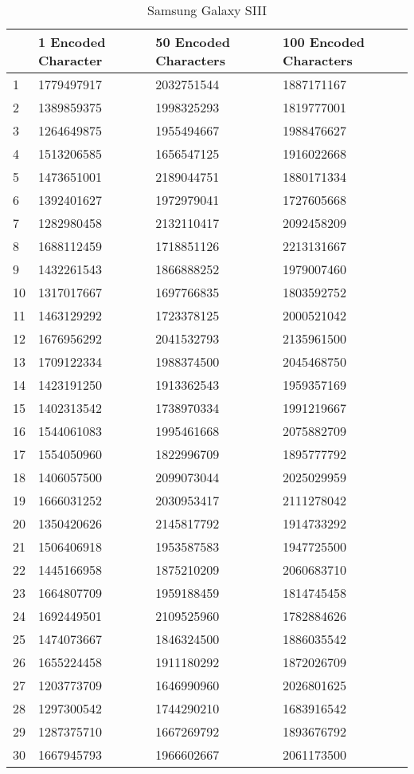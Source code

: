 	\begin{table}[ht!]
    		\caption{Samsung Galaxy SIII} \label{tab:distamceGoogleGlassFull}
		\centering \begin{tabularx}{\textwidth}{l|X|X|X} \hline
		& \textbf{1 Encoded Character} & \textbf{50 Encoded Characters} & \textbf{100 Encoded Characters} \\ \hline \hline
		
		1&	1779497917	&	2032751544	&	1887171167	\\ \hline
		2&	1389859375	&	1998325293	&	1819777001	\\ \hline
		3&	1264649875	&	1955494667	&	1988476627	\\ \hline
		4&	1513206585	&	1656547125	&	1916022668	\\ \hline
		5&	1473651001	&	2189044751	&	1880171334	\\ \hline
		6&	1392401627	&	1972979041	&	1727605668	\\ \hline
		7&	1282980458	&	2132110417	&	2092458209	\\ \hline
		8&	1688112459	&	1718851126	&	2213131667	\\ \hline
		9&	1432261543	&	1866888252	&	1979007460	\\ \hline
		10&	1317017667	&	1697766835	&	1803592752	\\ \hline
		11&	1463129292	&	1723378125	&	2000521042	\\ \hline
		12&	1676956292	&	2041532793	&	2135961500	\\ \hline
		13&	1709122334	&	1988374500	&	2045468750	\\ \hline
		14&	1423191250	&	1913362543	&	1959357169	\\ \hline
		15&	1402313542	&	1738970334	&	1991219667	\\ \hline
		16&	1544061083	&	1995461668	&	2075882709	\\ \hline
		17&	1554050960	&	1822996709	&	1895777792	\\ \hline
		18&	1406057500	&	2099073044	&	2025029959	\\ \hline
		19&	1666031252	&	2030953417	&	2111278042	\\ \hline
		20&	1350420626	&	2145817792	&	1914733292	\\ \hline
		21&	1506406918	&	1953587583	&	1947725500	\\ \hline
		22&	1445166958	&	1875210209	&	2060683710	\\ \hline
		23&	1664807709	&	1959188459	&	1814745458	\\ \hline
		24&	1692449501	&	2109525960	&	1782884626	\\ \hline
		25&	1474073667	&	1846324500	&	1886035542	\\ \hline
		26&	1655224458	&	1911180292	&	1872026709	\\ \hline
		27&	1203773709	&	1646990960	&	2026801625	\\ \hline
		28&	1297300542	&	1744290210	&	1683916542	\\ \hline
		29&	1287375710	&	1667269792	&	1893676792	\\ \hline
		30&	1667945793	&	1966602667	&	2061173500	\\ \hline
		
		\end{tabularx}
	\end{table}